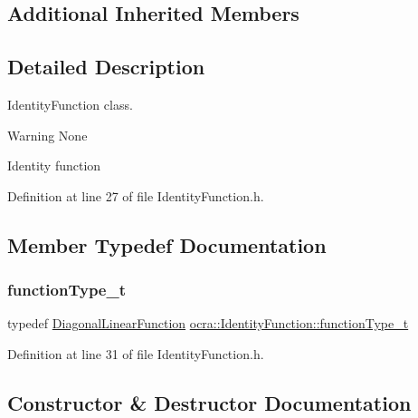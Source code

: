 \subsection*{Additional Inherited Members}


\subsection{Detailed Description}
Identity\+Function class. 

\begin{DoxyWarning}{Warning}
None
\end{DoxyWarning}
Identity function 

Definition at line 27 of file Identity\+Function.\+h.



\subsection{Member Typedef Documentation}
\hypertarget{classocra_1_1IdentityFunction_a4598384746d901d0a13b712666288894}{}\label{classocra_1_1IdentityFunction_a4598384746d901d0a13b712666288894} 
\subsubsection{\texorpdfstring{function\+Type\+\_\+t}{functionType\_t}}
{\footnotesize\ttfamily typedef \hyperlink{classocra_1_1DiagonalLinearFunction}{Diagonal\+Linear\+Function} \hyperlink{classocra_1_1IdentityFunction_a4598384746d901d0a13b712666288894}{ocra\+::\+Identity\+Function\+::function\+Type\+\_\+t}}



Definition at line 31 of file Identity\+Function.\+h.



\subsection{Constructor \& Destructor Documentation}
\hypertarget{classocra_1_1IdentityFunction_a65a20f4b0036a5a6ca7b0e92e34dc1b0}{}\label{classocra_1_1IdentityFunction_a65a20f4b0036a5a6ca7b0e92e34dc1b0} 

